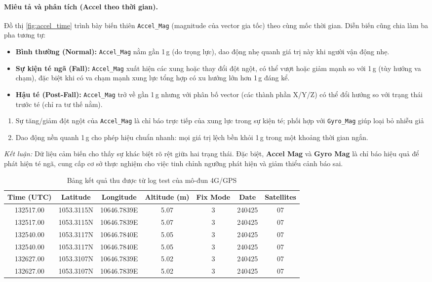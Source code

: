 \paragraph{Miêu tả và phân tích (Accel theo thời gian).}
Đồ thị \ref{fig:accel_time} trình bày biến thiên \texttt{Accel\_Mag} (magnitude của vector gia tốc) theo cùng mốc thời gian. Diễn biến cũng chia làm ba pha tương tự:
\begin{itemize}
  \item \textbf{Bình thường (Normal):} \texttt{Accel\_Mag} nằm gần 1\,g (do trọng lực), dao động nhẹ quanh giá trị này khi người vận động nhẹ.
  \item \textbf{Sự kiện té ngã (Fall):} \texttt{Accel\_Mag} xuất hiện các xung hoặc thay đổi đột ngột, có thể vượt hoặc giảm mạnh so với 1\,g (tùy hướng va chạm), đặc biệt khi có va chạm mạnh xung lực tổng hợp có xu hướng lớn hơn 1\,g đáng kể.
  \item \textbf{Hậu té (Post-Fall):} \texttt{Accel\_Mag} trở về gần 1\,g nhưng với phân bố vector (các thành phần X/Y/Z) có thể đổi hướng so với trạng thái trước té (chỉ ra tư thế nằm).
\end{itemize}

\begin{enumerate}
  \item Sự tăng/giảm đột ngột của \texttt{Accel\_Mag} là chỉ báo trực tiếp của xung lực trong sự kiện té; phối hợp với \texttt{Gyro\_Mag} giúp loại bỏ nhiễu giả   \item Dao động nền quanh 1\,g cho phép hiệu chuẩn nhanh: mọi giá trị lệch bền khỏi 1\,g trong một khoảng thời gian ngắn.
\end{enumerate}

\textit{Kết luận:} Dữ liệu cảm biến cho thấy sự khác biệt rõ rệt giữa hai trạng thái. Đặc biệt, \textbf{Accel Mag} và \textbf{Gyro Mag} là chỉ báo hiệu quả để phát hiện té ngã, cung cấp cơ sở thực nghiệm cho việc tinh chỉnh ngưỡng phát hiện và giảm thiểu cảnh báo sai.

\begin{table}[H]
\centering
\caption{Bảng kết quả thu được từ log test của mô-đun 4G/GPS}
\label{tab:gps_data}
\begin{tabular}{|c|c|c|c|c|c|c|}
\hline
\textbf{Time (UTC)} & \textbf{Latitude} & \textbf{Longitude} & \textbf{Altitude (m)} & \textbf{Fix Mode} & \textbf{Date} & \textbf{Satellites} \\
\hline
132517.00 & 1053.3115N & 10646.7839E & 5.07 & 3 & 240425 & 07 \\
132517.00 & 1053.3115N & 10646.7839E & 5.07 & 3 & 240425 & 07 \\
132540.00 & 1053.3117N & 10646.7840E & 5.05 & 3 & 240425 & 07 \\
132540.00 & 1053.3117N & 10646.7840E & 5.05 & 3 & 240425 & 07 \\
132627.00 & 1053.3107N & 10646.7839E & 5.02 & 3 & 240425 & 07 \\
132627.00 & 1053.3107N & 10646.7839E & 5.02 & 3 & 240425 & 07 \\
\hline
\end{tabular}
\end{table}

